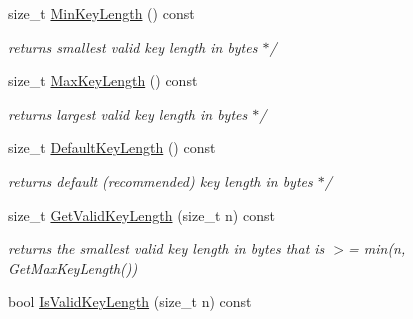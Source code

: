 \begin{DoxyCompactItemize}
\item 
\hypertarget{class_cipher_mode_base_a8224beab6f15889bae44d06efb8c01f1}{
size\_\-t \hyperlink{class_cipher_mode_base_a8224beab6f15889bae44d06efb8c01f1}{MinKeyLength} () const }
\label{class_cipher_mode_base_a8224beab6f15889bae44d06efb8c01f1}

\begin{DoxyCompactList}\small\item\em returns smallest valid key length in bytes $\ast$/ \item\end{DoxyCompactList}\item 
\hypertarget{class_cipher_mode_base_ae2b61a0b36c284db0500cbd82a92aa09}{
size\_\-t \hyperlink{class_cipher_mode_base_ae2b61a0b36c284db0500cbd82a92aa09}{MaxKeyLength} () const }
\label{class_cipher_mode_base_ae2b61a0b36c284db0500cbd82a92aa09}

\begin{DoxyCompactList}\small\item\em returns largest valid key length in bytes $\ast$/ \item\end{DoxyCompactList}\item 
\hypertarget{class_cipher_mode_base_a78845a270a50fc42f0a952e35c781ba6}{
size\_\-t \hyperlink{class_cipher_mode_base_a78845a270a50fc42f0a952e35c781ba6}{DefaultKeyLength} () const }
\label{class_cipher_mode_base_a78845a270a50fc42f0a952e35c781ba6}

\begin{DoxyCompactList}\small\item\em returns default (recommended) key length in bytes $\ast$/ \item\end{DoxyCompactList}\item 
\hypertarget{class_cipher_mode_base_a8c1ffbf107876873abb5039b2facf421}{
size\_\-t \hyperlink{class_cipher_mode_base_a8c1ffbf107876873abb5039b2facf421}{GetValidKeyLength} (size\_\-t n) const }
\label{class_cipher_mode_base_a8c1ffbf107876873abb5039b2facf421}

\begin{DoxyCompactList}\small\item\em returns the smallest valid key length in bytes that is $>$= min(n, GetMaxKeyLength()) \item\end{DoxyCompactList}\item 
\hypertarget{class_cipher_mode_base_a7e6c0f7dd7b952e4f6d46b16b2b2a5ad}{
bool \hyperlink{class_cipher_mode_base_a7e6c0f7dd7b952e4f6d46b16b2b2a5ad}{IsValidKeyLength} (size\_\-t n) const }
\label{class_cipher_mode_base_a7e6c0f7dd7b952e4f6d46b16b2b2a5ad}


\end{DoxyCompactItemize}
